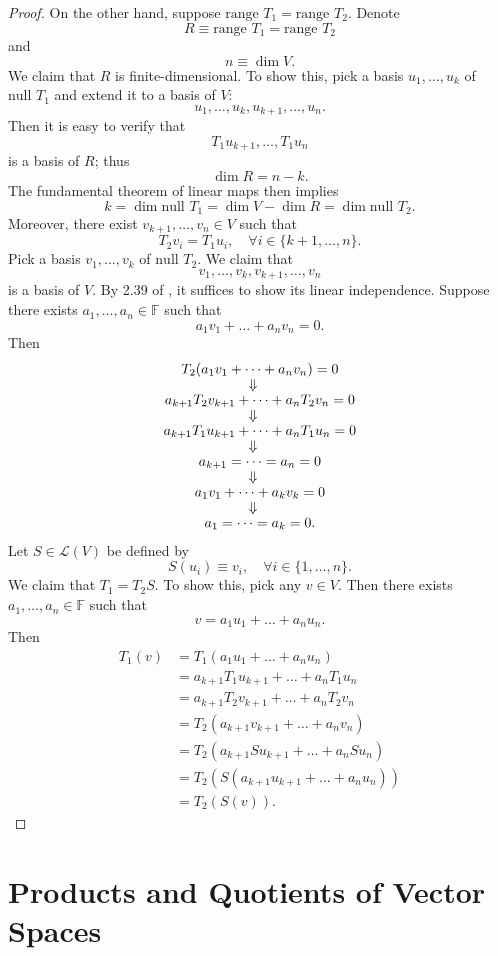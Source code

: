 \begin{proof}
On the other hand, suppose $\text{range }T_1=\text{range }T_2$. Denote\[
R\equiv\text{range }T_1=\text{range }T_2
\]and\[
n\equiv\dim V.
\]We claim that $R$ is finite-dimensional. To show this, pick a basis $u_1,\dots,u_k$ of $\text{null }T_1$ and extend it to a basis of $V$:\[
u_1,\dots,u_k,u_{k+1},\dots,u_n.
\]Then it is easy to verify that\[
T_1u_{k+1},\dots,T_1u_n
\]is a basis of $R$; thus\[
\dim R=n-k.
\]The fundamental theorem of linear maps then implies\[
k=\dim\text{null }T_1=\dim V-\dim R=\dim\text{null }T_2.
\]Moreover, there exist $v_{k+1},\dots,v_n\in V$ such that\[
T_2v_i=T_1u_i,\quad\forall i\in\{k+1,\dots,n\}.
\]Pick a basis $v_1,\dots,v_k$ of $\text{null }T_2$. We claim that\[
v_1,\dots,v_k,v_{k+1},\dots,v_n
\]is a basis of $V$. By 2.39 of \cite{axler2014linear}, it suffices to show its linear independence. Suppose there exists $a_1,\dots,a_n\in\mathbb{F}$ such that\[
a_1v_1+\dots+a_nv_n=0.
\]Then
\begin{gather*}
T_2(a_1v_1+\dots+a_nv_n)=0\\
\ArrowBetweenLines[\Downarrow]
a_{k+1}T_2v_{k+1}+\dots+a_nT_2v_n=0\\
\ArrowBetweenLines[\Downarrow]
a_{k+1}T_1u_{k+1}+\dots+a_nT_1u_n=0\\
\ArrowBetweenLines[\Downarrow]
a_{k+1}=\dots=a_n=0\\
\ArrowBetweenLines[\Downarrow]
a_1v_1+\dots+a_kv_k=0\\
\ArrowBetweenLines[\Downarrow]
a_1=\dots=a_k=0.
\end{gather*}
Let $S\in\mathcal{L}(V)$ be defined by\[
S(u_i)\equiv v_i,\quad\forall i\in\{1,\dots,n\}.
\]We claim that $T_1=T_2S$. To show this, pick any $v\in V$. Then there exists $a_1,\dots,a_n\in\mathbb{F}$ such that\[
v=a_1u_1+\dots+a_nu_n.
\]Then\[
\begin{split}
T_1(v)&=T_1(a_1u_1+\dots+a_nu_n)\\
&=a_{k+1}T_1u_{k+1}+\dots+a_nT_1u_n\\
&=a_{k+1}T_2v_{k+1}+\dots+a_nT_2v_n\\
&=T_2(a_{k+1}v_{k+1}+\dots+a_nv_n)\\
&=T_2(a_{k+1}Su_{k+1}+\dots+a_nSu_n)\\
&=T_2(S(a_{k+1}u_{k+1}+\dots+a_nu_n))\\
&=T_2(S(v)).
\end{split}
\]
\end{proof}

\chapter{Products and Quotients of Vector Spaces}
